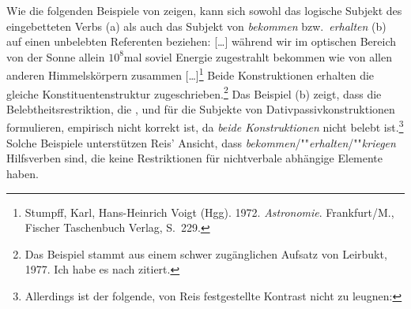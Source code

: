 Wie die folgenden Beispiele von \citet[]{Leirbukt87} zeigen,
kann sich sowohl das logische Subjekt des eingebetteten Verbs (a)
als auch das Subjekt von \emph{bekommen} bzw.\ \emph{erhalten} (b) auf einen unbelebten Referenten beziehen:
\eal
\label{ex-zustrahlen-zuschreiben}
\ex{}
{}[\ldots] während wir im     optischen Bereich von  der Sonne allein $10^8$mal    soviel  Energie zugestrahlt
     bekommen wie von  allen anderen Himmelskörpern zusammen [\ldots]\footnote{
        Stumpff, Karl, Hans-Heinrich Voigt (Hgg). 1972.
        \emph{Astronomie}. Frankfurt/M., Fischer Taschenbuch Verlag, S.\, 229.%
}
\ex 
Beide Konstruktionen erhalten die gleiche Konstituentenstruktur zugeschrieben.\footnote{
        Das Beispiel stammt aus einem schwer zugänglichen Aufsatz von
        Leirbukt, 1977. Ich habe es nach  zitiert.%
}
\zl
Das Beispiel (b) zeigt, dass die Belebtheitsrestriktion, 
die \citet[]{Reis76a}, \citet[]{Wegener86a} 
und \citet[]{Olsen97c} für die Subjekte von Dativpassivkonstruktionen formulieren,
empirisch nicht korrekt ist, da \emph{beide Konstruktionen} nicht belebt ist.\footnote{
        Allerdings ist der folgende, von Reis festgestellte Kontrast nicht zu leugnen:
        \eal
        \zllast
}
Solche Beispiele unterstützen Reis' Ansicht, dass \emph{bekommen}/""\emph{erhalten}/""\emph{kriegen} 
Hilfsverben sind, die keine Restriktionen für nichtverbale abhängige Elemente haben.


